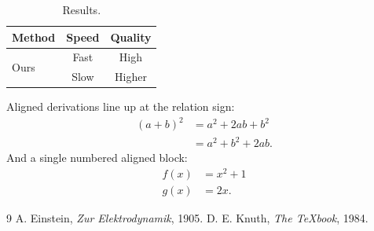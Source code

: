 \documentclass[twocolumn]{article}
\begin{document}
\begin{table}
\begin{tabular}{lcc}
\toprule
Method & Speed & Quality \\
\midrule
\multirow{2}{*}{Ours} & Fast & High \\
                      & Slow & Higher \\
\bottomrule
\end{tabular}
\caption{Results.}\label{tab:res}
\end{table}

Aligned derivations line up at the relation sign:
\begin{align*}
(a+b)^2 &= a^2 + 2ab + b^2 \\
        &= a^2 + b^2 + 2ab.
\end{align*}
And a single numbered aligned block:
\begin{equation}
\begin{aligned}
f(x) &= x^2 + 1 \\
g(x) &= 2x.
\end{aligned}
\end{equation}

\begin{thebibliography}{9}
 A. Einstein, \emph{Zur Elektrodynamik}, 1905.
 D. E. Knuth, \emph{The TeXbook}, 1984.
\end{thebibliography}
\end{document}
